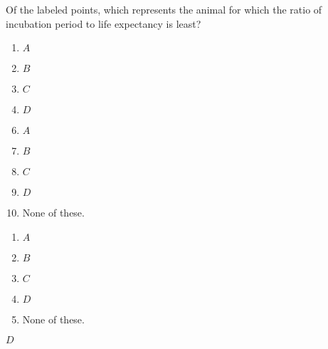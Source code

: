  
Of the labeled points, which represents the animal for which the ratio of incubation period to life expectancy is least?


\ifsat
	\begin{enumerate}[label=\Alph*)]
		\item $A $ 
		\item $B $ 
		\item $C $ 
		\item $D $ %
	\end{enumerate}
\else
\fi

\ifacteven
	\begin{enumerate}[label=\textbf{\Alph*.},itemsep=\fill,align=left]
		\setcounter{enumii}{5}
		\item $A $ 
		\item $B $ 
		\item $C $ 
		\addtocounter{enumii}{1}
		\item $D $ %
		\item None of these. 
	\end{enumerate}
\else
\fi

\ifactodd
	\begin{enumerate}[label=\textbf{\Alph*.},itemsep=\fill,align=left]
		\item $A $ 
		\item $B $ 
		\item $C $ 
		\item $D $ %
		\item None of these. 
	\end{enumerate}
\else
\fi

\ifgridin
 $D $ %

\else
\fi

